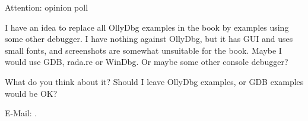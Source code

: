 \vspace*{\fill}

\huge Attention: opinion poll
\normalsize

\bigskip
\bigskip
\bigskip

I have an idea to replace all OllyDbg examples in the book by examples using some other debugger.
I have nothing against OllyDbg, but it has GUI and uses small fonts, and screenshots are somewhat unsuitable for the book.
Maybe I would use GDB, rada.re or WinDbg.
Or maybe some other console debugger?

What do you think about it?
Should I leave OllyDbg examples, or GDB examples would be OK?

E-Mail: \GTT{\EMAIL}.

\vspace*{\fill}
\vfill
